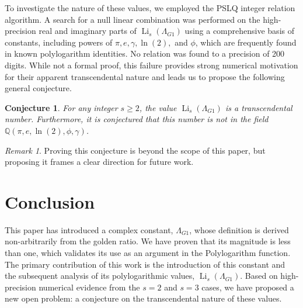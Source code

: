 \documentclass{amsart}
\theoremstyle{plain}
\newtheorem{conjecture}[theorem]{Conjecture}
\theoremstyle{definition}
\theoremstyle{remark}
\newtheorem*{remark}{Remark}
\DeclareMathOperator{\Li}{Li} %
\newcommand{\LambdaG}{\Lambda_{G1}}
\newcommand{\phiG}{\phi}
\begin{document}
To investigate the nature of these values, we employed the PSLQ integer relation algorithm. A search for a null linear combination was performed on the high-precision real and imaginary parts of $\Li_s(\LambdaG)$ using a comprehensive basis of constants, including powers of $\pi, e, \gamma, \ln(2),$ and $\phiG$, which are frequently found in known polylogarithm identities. No relation was found to a precision of 200 digits. While not a formal proof, this failure provides strong numerical motivation for their apparent transcendental nature and leads us to propose the following general conjecture.
\begin{conjecture}
For any integer $s \ge 2$, the value $\Li_s(\LambdaG)$ is a transcendental number. Furthermore, it is conjectured that this number is not in the field $\mathbb{Q}(\pi, e, \ln(2), \phiG, \gamma)$.
\end{conjecture}
\begin{remark}
Proving this conjecture is beyond the scope of this paper, but proposing it frames a clear direction for future work.
\end{remark}

\section{Conclusion}
This paper has introduced a complex constant, $\LambdaG$, whose definition is derived non-arbitrarily from the golden ratio. We have proven that its magnitude is less than one, which validates its use as an argument in the Polylogarithm function. The primary contribution of this work is the introduction of this constant and the subsequent analysis of its polylogarithmic values, $\Li_s(\LambdaG)$. Based on high-precision numerical evidence from the $s=2$ and $s=3$ cases, we have proposed a new open problem: a conjecture on the transcendental nature of these values.

\end{document}
